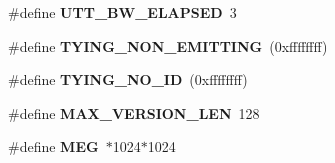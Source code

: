 \begin{DoxyCompactItemize}
\item 
\#define {\bfseries U\-T\-T\-\_\-\-B\-W\-\_\-\-E\-L\-A\-P\-S\-E\-D}~3\label{s3types_8h_a2bebd5b021cff915ca1f5fbd14c8b713}

\item 
\#define {\bfseries T\-Y\-I\-N\-G\-\_\-\-N\-O\-N\-\_\-\-E\-M\-I\-T\-T\-I\-N\-G}~(0xffffffff)\label{s3types_8h_addff2fcea68aef52d64b250b009f7187}

\item 
\#define {\bfseries T\-Y\-I\-N\-G\-\_\-\-N\-O\-\_\-\-I\-D}~(0xffffffff)\label{s3types_8h_a786a115928c98abbd3d4e5ac1bd6196f}

\item 
\#define {\bfseries M\-A\-X\-\_\-\-V\-E\-R\-S\-I\-O\-N\-\_\-\-L\-E\-N}~128\label{s3types_8h_ae84b1f33bc9f68e107cbe4834cf853ca}

\item 
\#define {\bfseries M\-E\-G}~$\ast$1024$\ast$1024\label{s3types_8h_a0faa13de5fe0bfac49a962ca59c3e047}

\end{DoxyCompactItemize}
